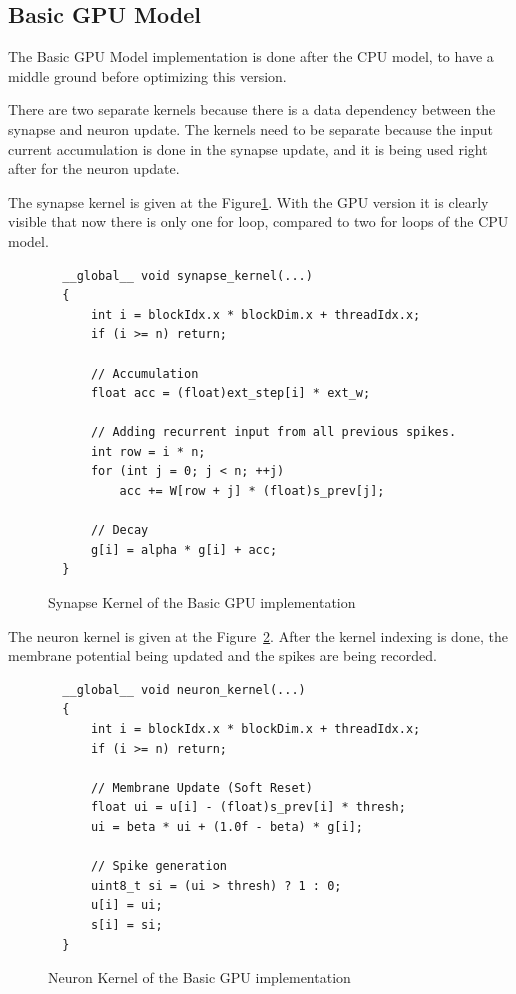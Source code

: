 \documentclass[11pt,a4paper]{article}
\begin{document}
\subsection{Basic GPU Model}

The Basic GPU Model implementation is done after the CPU model, to have a middle ground before optimizing this version.

There are two separate kernels because there is a data dependency between the synapse and neuron update. 
The kernels need to be separate because the input current accumulation is done in the synapse update, and it is being used right after for the neuron update. 

The synapse kernel is given at the Figure\ref{fig:Synapse_Basic_GPU_impl}.
With the GPU version it is clearly visible that now there is only one for loop, compared to two for loops of the CPU model.


  \begin{figure}[h]
\centering
\begin{lstlisting}
  __global__ void synapse_kernel(...)
  {
      int i = blockIdx.x * blockDim.x + threadIdx.x;
      if (i >= n) return;

      // Accumulation
      float acc = (float)ext_step[i] * ext_w;

      // Adding recurrent input from all previous spikes.
      int row = i * n;
      for (int j = 0; j < n; ++j)
          acc += W[row + j] * (float)s_prev[j];

      // Decay 
      g[i] = alpha * g[i] + acc;
  }
\end{lstlisting}
\caption{Synapse Kernel of the Basic GPU implementation}
\label{fig:Synapse_Basic_GPU_impl}
\end{figure}

The neuron kernel is given at the Figure~\ref{fig:Neuron_Basic_GPU_impl}. After the kernel indexing is done, the membrane potential being updated and the spikes are being recorded.

  \begin{figure}[h]
\centering
\begin{lstlisting}
  __global__ void neuron_kernel(...)
  {
      int i = blockIdx.x * blockDim.x + threadIdx.x;
      if (i >= n) return;

      // Membrane Update (Soft Reset)
      float ui = u[i] - (float)s_prev[i] * thresh;
      ui = beta * ui + (1.0f - beta) * g[i];

      // Spike generation
      uint8_t si = (ui > thresh) ? 1 : 0;
      u[i] = ui;
      s[i] = si;
  }
\end{lstlisting}
\caption{Neuron Kernel of the Basic GPU implementation}
\label{fig:Neuron_Basic_GPU_impl}
\end{figure}
\end{document}
